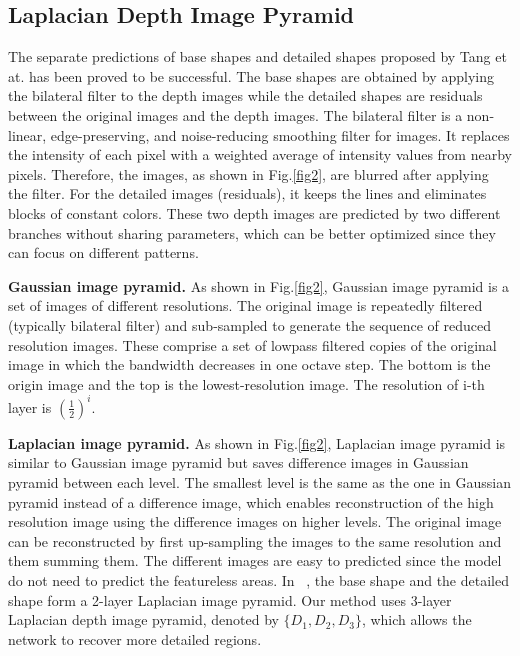 \documentclass{article} %
\begin{document}
\subsection{Laplacian Depth Image Pyramid}
The separate predictions of base shapes and detailed shapes proposed by Tang et at.\cite{tang2019neural} has been proved to be successful. The base shapes are obtained by applying the bilateral filter to the depth images while the detailed shapes are residuals between the original images and the depth images. The bilateral filter is a non-linear, edge-preserving, and noise-reducing smoothing filter for images. It replaces the intensity of each pixel with a weighted average of intensity values from nearby pixels. Therefore, the images, as shown in Fig.\ref{fig2}, are blurred after applying the filter. For the detailed images (residuals), it keeps the lines and eliminates blocks of constant colors. These two depth images are predicted by two different branches without sharing parameters, which can be better optimized since they can focus on different patterns. 

\textbf{Gaussian image pyramid.} As shown in Fig.\ref{fig2}, Gaussian image pyramid is a set of images of different resolutions. The original image is repeatedly filtered (typically bilateral filter) and sub-sampled to generate the sequence of reduced resolution images. These comprise a set of lowpass filtered copies of the original image in which the bandwidth decreases in one octave step. The bottom is the origin image and the top is the lowest-resolution image. The resolution of i-th layer is $(\frac{1}{2})^i$. 

\textbf{Laplacian image pyramid.} As shown in Fig.\ref{fig2}, Laplacian image pyramid is similar to Gaussian image pyramid but saves difference images in Gaussian pyramid between each level. The smallest level is the same as the one in Gaussian pyramid instead of a difference image, which enables reconstruction of the high resolution image using the difference images on higher levels. The original image can be reconstructed by first up-sampling the images to the same resolution and them summing them. The different images are easy to predicted since the model do not need to predict the featureless areas. In ~\cite{tang2019neural}, the base shape and the detailed shape form a 2-layer Laplacian image pyramid. Our method uses 3-layer Laplacian depth image pyramid, denoted by $\{D_1, D_2, D_3\}$, which allows the network to recover more detailed regions. 
\end{document}
